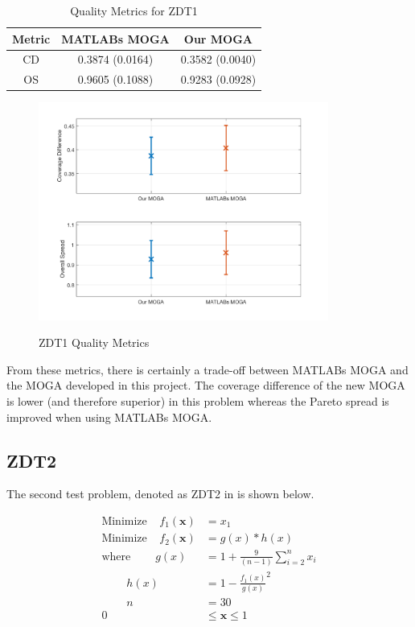 \documentclass{article}
\begin{document}
\begin{table}[h]
\caption{Quality Metrics for ZDT1} 
\centering 
\begin{tabular}{|c|c|c|} 
\hline\hline  
Metric & MATLABs MOGA & Our MOGA \\ \hline
CD & 0.3874 (0.0164) &  0.3582 (0.0040) \\ \hline
OS & 0.9605 (0.1088) & 0.9283 (0.0928) \\ \hline
\end{tabular}
\label{tab:ZDT1} 
\end{table}
\begin{figure}[h]
  \caption{ZDT1 Quality Metrics}
  \centering
  \includegraphics[width=0.85\textwidth]{ZDT1_QM.png}  
  \label{fig:ZDT1_QM}
\end{figure}

\noindent From these metrics, there is certainly a trade-off between MATLABs MOGA and the MOGA developed in this project. The coverage difference of the new MOGA is lower (and therefore superior) in this problem whereas the Pareto spread is improved when using MATLABs MOGA. 


\newpage
\subsection{ZDT2} 
The second test problem, denoted as ZDT2 in \cite{deb2001multi} is shown below. 


\begin{align*}
\textrm{Minimize} ~~~~~ f_1(\textbf{x}) &= x_1 \\
\textrm{Minimize} ~~~~~ f_2(\textbf{x}) &= g(x)*h(x) \\
\textrm{where} ~~~~~~~~~~ g(x) &= 1+\frac{9}{(n-1)}\sum_{i=2}^{n}x_i \\
~~~~~~~~~~ h(x) &= 1- \frac{f_1(x)}{g(x)}^2 \\
~~~~~~~~~~ n &= 30 \\
0 &\leq  \textbf{x}  \leq 1 \\
\end{align*}
\end{document}
